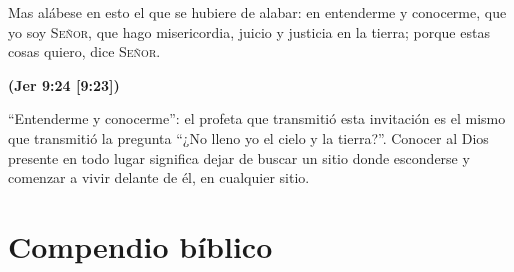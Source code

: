 \documentclass[11pt,letterpaper]{article}
\newcommand{\SENOR}{\textsc{Señor}}
\newcommand{\fuente}[1]{\par\hfill{\upshape\bfseries\small\textcolor{azul}{#1}}}
\begin{document}
\begin{cita}Mas alábese en esto el que se hubiere de alabar: en entenderme y conocerme, que yo soy \SENOR{}, que hago misericordia, juicio y justicia en la tierra; porque estas cosas quiero, dice \SENOR{}.\fuente{(Jer 9:24 [9:23])}\end{cita}

``Entenderme y conocerme'': el profeta que transmitió esta invitación es el mismo que transmitió la pregunta ``¿No lleno yo el cielo y la tierra?''. Conocer al Dios presente en todo lugar significa dejar de buscar un sitio donde esconderse y comenzar a vivir delante de él, en cualquier sitio.

\section*{Compendio bíblico}
\end{document}
